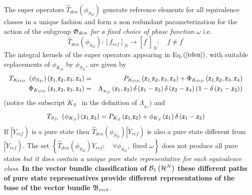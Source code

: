 The super operators $\hat{T}_{den}\left( \phi _{S_{D}}\right) $ generate
reference elements for all equivalence classes in a unique fashion and form
a non redundant parameterization for the action of the subgroup ${\frak G}%
_{den}$ {\it for a fixed choice of phase function }$\omega $ i.e. 
\begin{equation}
\hat{T}_{den}\left( \phi _{S_{D}}\right) :\left[ f_{ref}\right]
_{N}\rightarrow \left[ f^{\prime }\right] _{N};\quad f\neq f^{\prime }
\end{equation}%
The integral kernels of the super operators appearing in Eq.$\left( \ref%
{tden}\right) $, with suitable replacements of $\phi _{K_{D}}$ by $\phi
_{S_{D}}$, are given by%
\begin{eqnarray}
T_{K_{OD}{\rm \ }}\left( \phi _{S_{D}}\right) \left( {\sf z}_{1,}{\sf z}_{2},%
{\sf z}_{3},{\sf z}_{4}\right) &=&P_{K_{OD}}\left( {\sf z}_{1,}{\sf z}_{2},%
{\sf z}_{3},{\sf z}_{4}\right) +\Phi _{K_{OD}}\left( {\sf z}_{1,}{\sf z}_{2},%
{\sf z}_{3},{\sf z}_{4}\right)  \nonumber \\
\Phi _{K_{OD}}\left( {\sf z}_{1,}{\sf z}_{2},{\sf z}_{3},{\sf z}_{4}\right)
&=&\Lambda _{_{K_{S}}}\left( {\sf z}_{1},{\sf z}_{2}\right) \delta \left( 
{\sf z}_{1}-{\sf z}_{3}\right) \delta \left( {\sf z}_{2}-{\sf z}_{4}\right)
\left( 1-\delta \left( {\sf z}_{1}-{\sf z}_{2}\right) \right)  \label{tden2}
\end{eqnarray}%
(notice the subscript $K_{S\text{ }}$ in the definition of $\Lambda
_{_{K_{S}}}$) and 
\begin{equation}
T_{S_{D}{\rm \ }}\left( \phi _{K_{S}}\right) \left( {\sf z}_{1,}{\sf z}%
_{2}\right) =P_{K_{S}}\left( {\sf z}_{1,}{\sf z}_{2}\right) +\phi
_{K_{S}}\left( {\sf z}_{1}\right) \delta \left( {\sf z}_{1}-{\sf z}%
_{2}\right)  \label{tden3}
\end{equation}%
If $\left| \breve{Y}_{ref}\right) $ is a pure state then $\hat{T}%
_{den}\left( \phi _{S_{D}}\right) \left| \breve{Y}_{ref}\right) $ is also a
pure state different from $\left| \breve{Y}_{ref}\right) $. The set $\left\{ 
\hat{T}_{den}\left( \phi _{S_{D}}\right) \breve{Y}_{ref};\quad \forall \phi
_{S_{D}},\text{ fixed }\omega \right\} $ does not produce all pure states 
{\it but it does contain a unique pure state representative for each
equivalence class. }{\bf In the vector bundle classification of }${\cal B}%
_{1}\left( {\cal H}^{N}\right) $ {\bf these different} {\bf paths of pure
state represenatives provide different representations of the base of the
vector bundle }${\frak B}_{vect}$.

